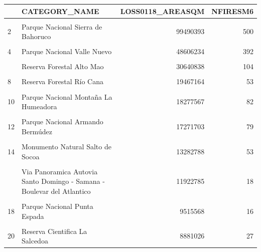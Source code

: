 \documentclass[10pt,landscape,a3paper]{article}
\begin{document}
\begin{table}[H]
\centering
\begin{tabular}[t]{llrr}
\toprule
  & CATEGORY\_NAME & LOSS0118\_AREASQM & NFIRESM6\\
\midrule
\cellcolor{lightgray}{1} & \cellcolor{lightgray}{Parque Nacional Los Haitises} & \cellcolor{lightgray}{106098081} & \cellcolor{lightgray}{308}\\
2 & Parque Nacional Sierra de Bahoruco & 99490393 & 500\\
\cellcolor{lightgray}{3} & \cellcolor{lightgray}{Parque Nacional José del Carmen Ramírez} & \cellcolor{lightgray}{90356487} & \cellcolor{lightgray}{727}\\
4 & Parque Nacional Valle Nuevo & 48606234 & 392\\
\cellcolor{lightgray}{5} & \cellcolor{lightgray}{Parque Nacional Manolo Tavarez Justo} & \cellcolor{lightgray}{34746840} & \cellcolor{lightgray}{128}\\
\addlinespace
6 & Reserva Forestal Alto Mao & 30640838 & 104\\
\cellcolor{lightgray}{7} & \cellcolor{lightgray}{Reserva Forestal Alto bao} & \cellcolor{lightgray}{21401203} & \cellcolor{lightgray}{23}\\
8 & Reserva Forestal Río Cana & 19467164 & 53\\
\cellcolor{lightgray}{9} & \cellcolor{lightgray}{Monumento Natural Las Caobas} & \cellcolor{lightgray}{18868449} & \cellcolor{lightgray}{76}\\
10 & Parque Nacional Montaña La Humeadora & 18277567 & 82\\
\addlinespace
\cellcolor{lightgray}{11} & \cellcolor{lightgray}{Parque Nacional Nalga de Maco} & \cellcolor{lightgray}{17958794} & \cellcolor{lightgray}{117}\\
12 & Parque Nacional Armando Bermúdez & 17271703 & 79\\
\cellcolor{lightgray}{13} & \cellcolor{lightgray}{Reserva Forestal Cerro Chacuey} & \cellcolor{lightgray}{13734337} & \cellcolor{lightgray}{82}\\
14 & Monumento Natural Salto de Socoa & 13282788 & 53\\
\cellcolor{lightgray}{15} & \cellcolor{lightgray}{Via Panoramica Entrada de Mao} & \cellcolor{lightgray}{12301958} & \cellcolor{lightgray}{69}\\
\addlinespace
16 & Via Panoramica Autovia Santo Domingo - Samana - Boulevar del Atlantico & 11922785 & 18\\
\cellcolor{lightgray}{17} & \cellcolor{lightgray}{Reserva Forestal Barrero} & \cellcolor{lightgray}{10128739} & \cellcolor{lightgray}{20}\\
18 & Parque Nacional Punta Espada & 9515568 & 16\\
\cellcolor{lightgray}{19} & \cellcolor{lightgray}{Reserva Biológica Loma Charco Azul} & \cellcolor{lightgray}{9334805} & \cellcolor{lightgray}{22}\\
20 & Reserva Cientifica La Salcedoa & 8881026 & 27\\
\bottomrule
\end{tabular}
\end{table}
\end{document}
